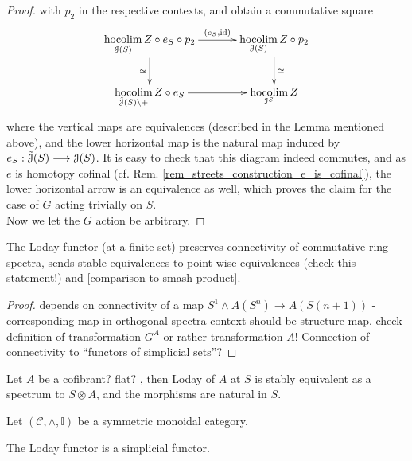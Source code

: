 \begin{lem}
\begin{proof}
        with $p_2$ in the respective contexts, and obtain a commutative square
        \begin{displaymath}
          \xymatrix@C+1em{
            \hocolim\limits_{\tilde{\cJ}(S)} Z \circ e_S \circ p_2
              \ar[r]^-{(e_S, \id)}
              \ar[d]_-{\simeq}
            &
            \hocolim\limits_{\cJ(S)} Z \circ p_2
              \ar[d]^-{\simeq}
            \\
            \hocolim\limits_{\tilde{\cJ}(S) \setminus {+}} Z \circ e_S
              \ar[r]
            &
            \hocolim\limits_{\cI^S} Z
          }
        \end{displaymath}
        where the vertical maps are equivalences (described in the Lemma
        mentioned above), and the lower horizontal map is the natural map induced
        by $e_S: \tilde{\mathcal{J}}(S) \longrightarrow \mathcal{J}(S)$. It is easy to check that this
        diagram indeed commutes, and as $e$ is homotopy cofinal (cf. Rem.
        \ref{rem_streets_construction_e_is_cofinal}), the lower horizontal arrow
        is an equivalence as well, which proves the claim for the case of $G$
        acting trivially on $S$.\\
        Now we let the $G$ action be arbitrary. 
      \end{proof}
    \end{lem}
    \begin{lem}\label{lem_loday_functor_preserves_connectivity}
      The Loday functor (at a finite set) preserves connectivity of commutative ring spectra, sends stable equivalences to point-wise equivalences (check this statement!) and [comparison to smash product].
      \begin{proof}
        depends on connectivity of a map $S^1 \wedge A(S^n) \to A(S(n+1))$ - corresponding map in orthogonal spectra context should be structure map. check definition of transformation $G^A$ or rather transformation $A$! Connection of connectivity to ``functors of simplicial sets''?
      \end{proof}
    \end{lem}
    \begin{cor}\label{cor_loday_at_S_naturally_equivalent_to_tensor_with_S}
      Let $A$ be a cofibrant? flat? \hring, then Loday of $A$ at $S$ is stably equivalent as a spectrum to $S \otimes A$, and the morphisms are natural in $S$.
    \end{cor}
    \begin{defn}\label{def_loday_functor_in_symmetric_monoidal_category} 
      Let $(\mathcal{C},\wedge, \mathbb{I})$ be a symmetric monoidal category.\\
    \end{defn}
    \begin{lem}\label{lem_loday_functor_is_simplicial}
      The Loday functor is a simplicial functor.\\
    \end{lem}
